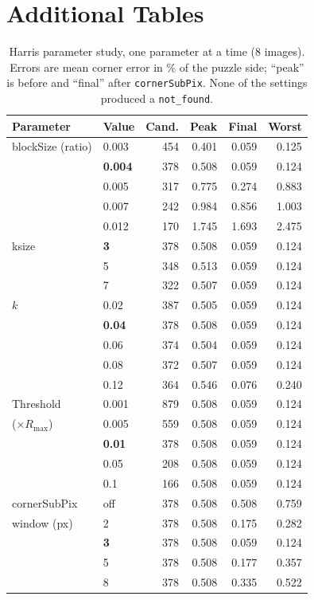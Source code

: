 \documentclass[conference]{IEEEtran}
\begin{document}
\section{Additional Tables}
\label{app:tables}
\begin{table}[h]
\centering\footnotesize
\caption{Harris parameter study, one parameter at a time (8 images). Errors are mean corner error in \% of the puzzle side; ``peak'' is before and ``final'' after \texttt{cornerSubPix}. None of the settings produced a \texttt{not\_found}.}
\label{tab:harris}
\begin{tabular}{@{}l l r r r r@{}}
\toprule
Parameter & Value & Cand. & Peak & Final & Worst\\
\midrule
blockSize (ratio) & 0.003 & 454 & 0.401 & 0.059 & 0.125\\
 & \textbf{0.004} & 378 & 0.508 & 0.059 & 0.124\\
 & 0.005 & 317 & 0.775 & 0.274 & 0.883\\
 & 0.007 & 242 & 0.984 & 0.856 & 1.003\\
 & 0.012 & 170 & 1.745 & 1.693 & 2.475\\
\midrule
ksize & \textbf{3} & 378 & 0.508 & 0.059 & 0.124\\
 & 5 & 348 & 0.513 & 0.059 & 0.124\\
 & 7 & 322 & 0.507 & 0.059 & 0.124\\
\midrule
$k$ & 0.02 & 387 & 0.505 & 0.059 & 0.124\\
 & \textbf{0.04} & 378 & 0.508 & 0.059 & 0.124\\
 & 0.06 & 374 & 0.504 & 0.059 & 0.124\\
 & 0.08 & 372 & 0.507 & 0.059 & 0.124\\
 & 0.12 & 364 & 0.546 & 0.076 & 0.240\\
\midrule
Threshold & 0.001 & 879 & 0.508 & 0.059 & 0.124\\
($\times R_{\max}$) & 0.005 & 559 & 0.508 & 0.059 & 0.124\\
 & \textbf{0.01} & 378 & 0.508 & 0.059 & 0.124\\
 & 0.05 & 208 & 0.508 & 0.059 & 0.124\\
 & 0.1 & 166 & 0.508 & 0.059 & 0.124\\
\midrule
cornerSubPix & off & 378 & 0.508 & 0.508 & 0.759\\
window (px) & 2 & 378 & 0.508 & 0.175 & 0.282\\
 & \textbf{3} & 378 & 0.508 & 0.059 & 0.124\\
 & 5 & 378 & 0.508 & 0.177 & 0.357\\
 & 8 & 378 & 0.508 & 0.335 & 0.522\\
\bottomrule
\end{tabular}
\end{table}
\end{document}
